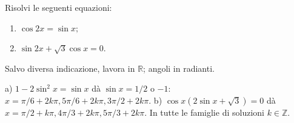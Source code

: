 
\begin{esercizio}
Risolvi le seguenti equazioni: 

\begin{enumerate}
\item $\displaystyle \cos 2x=\sin x;$

\item $\displaystyle \sin 2x+\sqrt{3}\cos x=0.$
\end{enumerate}
Salvo diversa indicazione, lavora in $\mathbb R$; angoli in radianti.
\end{esercizio}

\begin{soluzione}
a) $1-2\sin^2x=\sin x$ dà $\sin x=1/2$ o $-1$:
$x=\pi/6+2k\pi,5\pi/6+2k\pi,3\pi/2+2k\pi$.
b) $\cos x(2\sin x+\sqrt3)=0$ dà
$x=\pi/2+k\pi,4\pi/3+2k\pi,5\pi/3+2k\pi$. In tutte le famiglie di soluzioni $k\in\mathbb{Z}$.
\end{soluzione}
